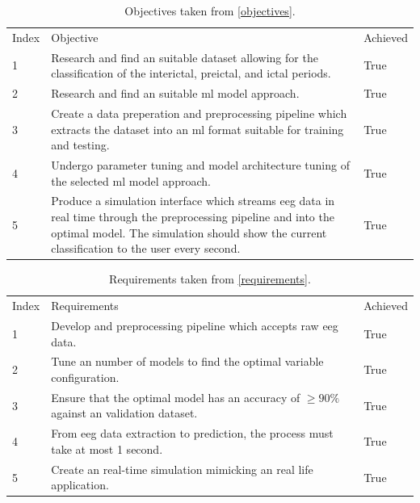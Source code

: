 \documentclass[12pt]{article}
\begin{document}
\begin{table}[H]
\centering
\begin{tabular}{p{}p{}p{}}
Index & Objective                                                                                                                                                                                                                    & Achieved \\
1     & Research and find an suitable dataset allowing for the classification of the interictal, preictal, and ictal periods.                                                                                                        & True     \\
2     & Research and find an suitable \acrshort{ml} model approach.                                                                                                                                                                  & True     \\
3     & Create a data preperation and preprocessing pipeline which extracts the dataset into an \acrshort{ml} format suitable for training and testing.                                                                              & True     \\
4     & Undergo parameter tuning and model architecture tuning of the selected \acrshort{ml} model approach.                                                                                                                         & True     \\
5     & Produce a simulation interface which streams \acrshort{eeg} data in real time through the preprocessing pipeline and into the optimal model. The simulation should show the current classification to the user every second. & True    
\end{tabular}
\caption{Objectives taken from \ref{objectives}.}
\label{tab:objectives-review}
\end{table}


\begin{table}[H]
\centering
\begin{tabular}{p{}p{}p{}}
Index & Requirements                                                                               & Achieved \\
1     & Develop and preprocessing pipeline which accepts raw \acrshort{eeg} data.                  & True     \\
2     & Tune an number of models to find the optimal variable configuration.                       & True     \\
3     & Ensure that the optimal model has an accuracy of $\geq90\%$ against an validation dataset. & True     \\
4     & From \acrshort{eeg} data extraction to prediction, the process must take at most 1 second. & True     \\
5     & Create an real-time simulation mimicking an real life application.                         & True    
\end{tabular}
\caption{Requirements taken from \ref{requirements}.}
\label{tab:requirements-review}
\end{table}
\end{document}
